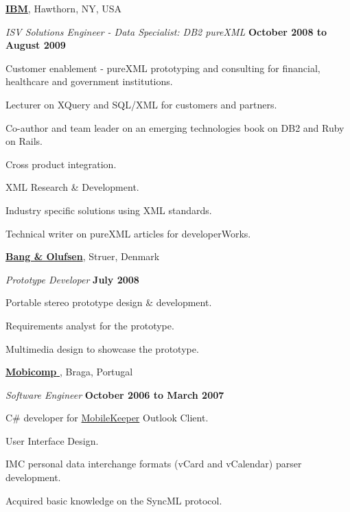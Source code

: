 \documentclass[10pt]{article}
\newenvironment{outerlist}[1][\enskip\textbullet]%
        {\begin{enumerate}[#1]}{\end{enumerate}%
         \vspace{-.6\baselineskip}}
\newenvironment{innerlist}[1][\enskip\textbullet]%
        {\begin{compactenum}[#1]}{\end{compactenum}}
\newcommand{\blankline}{\quad\pagebreak[2]}
\begin{document}
\blankline

\href{http://www.ibm.com/}{\textbf{IBM}}, 
Hawthorn, NY, USA
\begin{outerlist}

  \item[] \textit{ISV Solutions Engineer - Data Specialist: DB2 pureXML}%
          \hfill \textbf{October 2008 to August 2009}
  \begin{innerlist}
    \item Customer enablement - pureXML prototyping and consulting for financial, healthcare and government institutions.
    \item Lecturer on XQuery and SQL/XML for customers and partners.
    \item Co-author and team leader on an emerging technologies book on DB2 and Ruby on Rails.
    \item Cross product integration.
    \item XML Research \& Development.
    \item Industry specific solutions using XML standards.
    \item Technical writer on pureXML articles for developerWorks.
  \end{innerlist}

\end{outerlist}

\blankline

\href{http://www.bang-olufsen.com}{\textbf{Bang \& Olufsen}}, 
Struer, Denmark
\begin{outerlist}

\item[] \textit{Prototype Developer}%
        \hfill \textbf{July 2008}
\begin{innerlist}
  \item Portable stereo prototype  design \& development.
  \item Requirements analyst for the prototype.
  \item Multimedia design to showcase the prototype.
\end{innerlist}

\end{outerlist}

\blankline

\href{http://www.mobicomp.com/}{\textbf{Mobicomp} }, 
Braga, Portugal
\begin{outerlist}

\item[] \textit{Software Engineer}%
        \hfill \textbf{October 2006 to March 2007}
\begin{innerlist}
	\item C\# developer for \href{http://myphone.microsoft.com}{MobileKeeper} Outlook Client.
	\item User Interface Design.
	\item IMC personal data interchange formats (vCard and vCalendar) parser development.
    \item  Acquired basic knowledge on the SyncML protocol.
\end{innerlist}

\end{outerlist}
\end{document}
